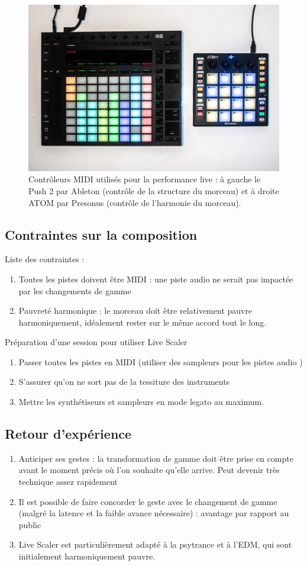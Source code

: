 \documentclass[french,11pt]{article}
\begin{document}
\begin{figure}[htbp]
  \centering
  \includegraphics[width=\textwidth]{Figures/IMGP9899.jpg}
  \caption{Contrôleurs MIDI utilisés pour la performance live : à gauche le Push 2 par Ableton (contrôle de la structure du morceau) et à droite ATOM par Presonus (contrôle de l'harmonie du morceau).}
\end{figure}

\subsection{Contraintes sur la composition}
Liste des contraintes :
\begin{enumerate}
  \item Toutes les pistes doivent être MIDI : une piste audio ne serait pas impactée par les changements de gamme
  \item Pauvreté harmonique : le morceau doit être relativement pauvre harmoniquement, idéalement rester sur le même accord tout le long.
\end{enumerate}
Préparation d'une session pour utiliser Live Scaler
\begin{enumerate}
  \item Passer toutes les pistes en MIDI (utiliser des sampleurs pour les pistes audio )
  \item S'assurer qu'on ne sort pas de la tessiture des instruments
  \item Mettre les synthétiseurs et sampleurs en mode legato au maximum.
\end{enumerate}
\subsection{Retour d'expérience}
\begin{enumerate}
  \item Anticiper ses gestes : la transformation de gamme doit être prise en compte avant le moment précis où l'on souhaite qu'elle arrive. Peut devenir très technique assez rapidement
  \item Il est possible de faire concorder le geste avec le changement de gamme (malgré la latence et la faible avance nécessaire) : avantage par rapport au public
  \item Live Scaler est particulièrement adapté à la psytrance et à l'EDM, qui sont initialement harmoniquement pauvre.
\end{enumerate}
\end{document}
